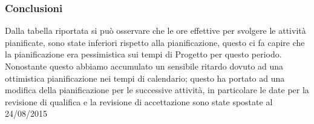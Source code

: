 \subsubsection{Conclusioni}

Dalla tabella riportata si può osservare che le ore effettive per svolgere le attività pianificate, sono state inferiori rispetto alla pianificazione, questo ci fa capire che la pianificazione era pessimistica sui tempi di Progetto per questo periodo.
Nonostante questo abbiamo accumulato un sensibile ritardo dovuto ad una ottimistica pianificazione nei tempi di calendario; questo ha portato ad una modifica della pianificazione per le successive attività, in particolare le date per la revisione di qualifica e la revisione di accettazione sono state spostate al 24/08/2015




